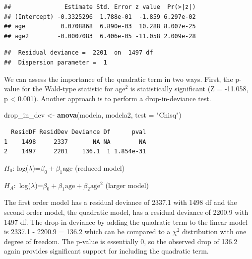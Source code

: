 \documentclass[
]{krantz}
\newenvironment{Shaded}{\begin{snugshade}}{\end{snugshade}}
\newcommand{\DataTypeTok}[1]{\textcolor[rgb]{0.27,0.27,0.27}{#1}}
\newcommand{\KeywordTok}[1]{\textcolor[rgb]{0.27,0.27,0.27}{\textbf{#1}}}
\newcommand{\NormalTok}[1]{#1}
\newcommand{\OperatorTok}[1]{\textcolor[rgb]{0.43,0.43,0.43}{\textbf{#1}}}
\newcommand{\StringTok}[1]{\textcolor[rgb]{0.5,0.5,0.5}{#1}}
\begin{document}
\begin{Shaded}
\end{Shaded}

\begin{verbatim}
##               Estimate Std. Error z value  Pr(>|z|)
## (Intercept) -0.3325296  1.788e-01  -1.859 6.297e-02
## age          0.0708868  6.890e-03  10.288 8.007e-25
## age2        -0.0007083  6.406e-05 -11.058 2.009e-28
\end{verbatim}

\begin{verbatim}
##  Residual deviance =  2201  on  1497 df 
##  Dispersion parameter =  1
\end{verbatim}

We can assess the importance of the quadratic term in two ways. First, the p-value for the Wald-type statistic for age\(^2\) is statistically significant (Z = -11.058, p \textless{} 0.001). Another approach is to perform a drop-in-deviance test.

\begin{Shaded}
\begin{Highlighting}[]
\NormalTok{drop_in_dev <-}\StringTok{ }\KeywordTok{anova}\NormalTok{(modela, modela2, }\DataTypeTok{test =} \StringTok{"Chisq"}\NormalTok{)}
\end{Highlighting}
\end{Shaded}

\begin{verbatim}
  ResidDF ResidDev Deviance Df      pval
1    1498     2337       NA NA        NA
2    1497     2201    136.1  1 1.854e-31
\end{verbatim}

\(H_0\): log(\(\lambda\))=\(\beta_0+\beta_1 \textrm{age}\) (reduced model)

\(H_A:\) log(\(\lambda\))=\(\beta_0+\beta_1 \textrm{age} + \beta_2 \textrm{age}^2\) (larger model)

The first order model has a residual deviance of 2337.1 with 1498 df and the second order model, the quadratic model, has a residual deviance of 2200.9 with 1497 df. The drop-in-deviance by adding the quadratic term to the linear model is 2337.1 - 2200.9 = 136.2 which can be compared to a \(\chi^2\) distribution with one degree of freedom. The p-value is essentially 0, so the observed drop of 136.2 again provides significant support for including the quadratic term.
\end{document}
